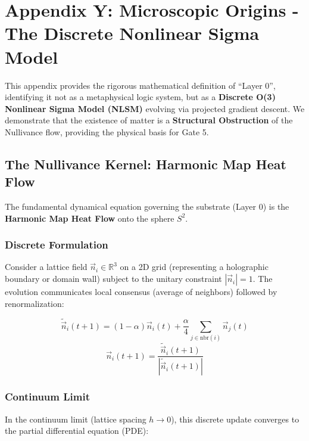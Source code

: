 \section{Appendix Y: Microscopic Origins - The Discrete Nonlinear Sigma Model}
\label{app:layer0}

This appendix provides the rigorous mathematical definition of ``Layer 0'', identifying it not as a metaphysical logic system, but as a \textbf{Discrete O(3) Nonlinear Sigma Model (NLSM)} evolving via projected gradient descent. We demonstrate that the existence of matter is a \textbf{Structural Obstruction} of the Nullivance flow, providing the physical basis for Gate 5.

\subsection{The Nullivance Kernel: Harmonic Map Heat Flow}

The fundamental dynamical equation governing the substrate (Layer 0) is the \textbf{Harmonic Map Heat Flow} onto the sphere $S^2$.

\subsubsection{Discrete Formulation}
Consider a lattice field $\vec{n}_i \in \mathbb{R}^3$ on a 2D grid (representing a holographic boundary or domain wall) subject to the unitary constraint $|\vec{n}_i| = 1$. The evolution communicates local consensus (average of neighbors) followed by renormalization:

\begin{equation}
    \tilde{\vec{n}}_i(t+1) = (1-\alpha)\vec{n}_i(t) + \frac{\alpha}{4}\sum_{j \in \text{nbr}(i)} \vec{n}_j(t)
\end{equation}
\begin{equation}
    \vec{n}_i(t+1) = \frac{\tilde{\vec{n}}_i(t+1)}{|\tilde{\vec{n}}_i(t+1)|}
\end{equation}

\subsubsection{Continuum Limit}
In the continuum limit (lattice spacing $h \to 0$), this discrete update converges to the partial differential equation (PDE):

